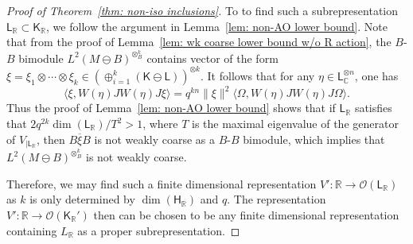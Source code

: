 \documentclass[a4paper,11pt]{amsart}
\theoremstyle{definition}
\newcommand{\C}{{\mathbb C}}
\newcommand{\R}{{\mathbb R}}
\newcommand{\cO}{{\mathcal O}}
\newcommand{\sH}{\mathsf{H}}
\newcommand{\sK}{\mathsf{K}}
\newcommand{\sL}{\mathsf{L}}
\newcommand{\ot}{\otimes}
\begin{document}
\begin{proof}[Proof of Theorem~\ref{thm: non-iso inclusions}]
	
	
To to find such a subrepresentation $\sL_\R\subset \sK_\R$, we follow the argument in Lemma~\ref{lem: non-AO lower bound}.
Note that from the proof of Lemma~\ref{lem: wk coarse lower bound w/o R action},
	the $B$-$B$ bimodule $L^2(M\ominus B)^{\ot_{B}^k}$ 
	contains vector of the form $\xi=\xi_1\ot \cdots \ot \xi_k \in (\oplus_{i=1}^{k} (\sK\ominus \sL))^{\ot k}$.
It follows that for any $\eta\in \sL_\C^{\ot n}$, one has
$$
\langle\xi, W(\eta)JW(\eta)J\xi\rangle=q^{kn} \|\xi\|^2\langle\Omega, W(\eta) JW(\eta)J\Omega\rangle.
$$
Thus the proof of Lemma~\ref{lem: non-AO lower bound} shows that if $\sL_\R$ satisfies that $2q^{2k} \dim(\sL_\R)/T^2>1$,
	where $T$ is the maximal eigenvalue of the generator of $V_{\mid \sL_\R}$,
	then $\overline{B\xi B}$ is not weakly coarse as a $B$-$B$ bimodule,
	which implies that $L^2(M\ominus B)^{\ot_B^k}$ is not weakly coarse.

Therefore, we may find such a finite dimensional representation $V': \R\to \cO(\sL_\R)$ as $k$ is only determined by $\dim(\sH_\R)$ and $q$.
The representation $V': \R\to \cO(\sK_\R')$ then can be chosen to be any finite dimensional representation containing $L_\R$ as a proper subrepresentation.
\end{proof}




\end{document}
